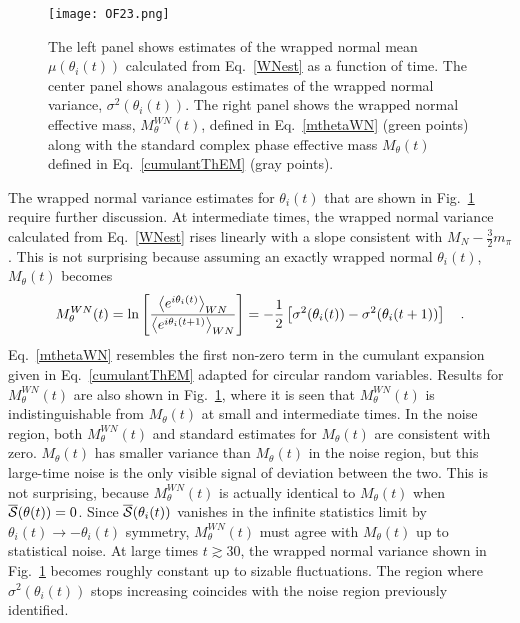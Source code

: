 %
\begin{figure}[!ht]
  \centering
  \texttt{[image: OF23.png]}
  \caption{
    The left panel shows estimates of the wrapped normal mean $\mu(\theta_i(t))$ calculated from Eq.~\eqref{WNest} as a function of time.
  The center panel shows analagous estimates of the wrapped normal variance, $\sigma^2(\theta_i(t))$.
  The right panel shows the wrapped normal effective mass, $M_\theta^{WN}(t)$, 
  defined in Eq.~\eqref{mthetaWN}  (green points) 
  along with the standard complex phase effective mass $M_\theta(t)$ 
 defined in Eq.~\eqref{cumulantThEM}  (gray points).
 }
  \label{ThWN}
\end{figure}
%
The wrapped normal variance estimates for $\theta_i(t)$ that are shown in Fig.~\ref{ThWN} require further discussion. 
At intermediate times, the wrapped normal variance calculated from Eq.~\eqref{WNest} rises linearly with a slope consistent with $M_N - \frac{3}{2}m_\pi$. This is not surprising because assuming an exactly wrapped normal $\theta_i(t)$, $M_\theta(t)$ becomes
%
\begin{equation}
  \begin{split}
    M_\theta^{WN}(t) = \ln\left[\frac{\avg{e^{i\theta_i(t)}}_{WN}}{\avg{e^{i\theta_i(t+1)}}_{WN}}\right] = -\frac{1}{2}\left[\sigma^2(\theta_i(t)) - \sigma^2(\theta_i(t+1))\right]
    \ \ \  .
  \end{split}
  \label{mthetaWN}
\end{equation}
%
Eq.~\eqref{mthetaWN} resembles the first non-zero term in the cumulant expansion given in Eq.~\eqref{cumulantThEM} 
adapted for circular random variables. 
Results for $M_\theta^{WN}(t)$ are also shown in Fig.~\ref{ThWN}, where it is seen that $M_\theta^{WN}(t)$ is indistinguishable 
from $M_\theta(t)$ at small and intermediate times. In the noise region, both $M_\theta^{WN}(t)$ and standard estimates for 
$M_\theta(t)$ are consistent with zero. $M_\theta(t)$ has smaller variance than $M_\theta(t)$ in the noise region, 
but this large-time noise is the only visible signal of deviation between the two. This is not surprising, because 
$M_\theta^{WN}(t)$ is actually identical to $M_\theta(t)$ when $\bar{\cal S}(\theta(t)) = 0$. Since $\bar{\cal S}(\theta_i(t))$ 
vanishes in the infinite statistics limit by $\theta_i(t) \rightarrow -\theta_i(t)$ symmetry, $M_\theta^{WN}(t)$ must 
agree with $M_\theta(t)$ up to statistical noise. At large times $t\gtrsim 30$, the wrapped normal variance shown in 
Fig.~\ref{ThWN}  becomes roughly constant up to sizable fluctuations. 
The region where $\sigma^2(\theta_i(t))$ stops increasing coincides with the noise region previously identified. 



